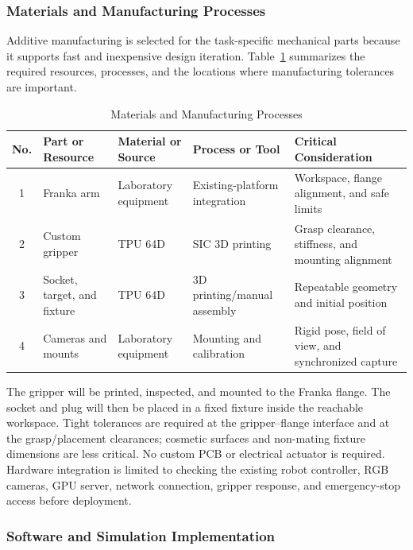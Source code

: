 \documentclass[12pt, letterpaper]{article}
\begin{document}
\subsubsection{Materials and Manufacturing Processes}

Additive manufacturing is selected for the task-specific mechanical parts
because it supports fast and inexpensive design iteration. Table~\ref{tab:manufacturing-processes}
summarizes the required resources, processes, and the locations where
manufacturing tolerances are important.

\begin{table}[H]
\centering
\caption{Materials and Manufacturing Processes}
\label{tab:manufacturing-processes}
\footnotesize
\setlength{\tabcolsep}{3pt}
\begin{tabularx}{\textwidth}{cXXXX}
\toprule
\textbf{No.} & \textbf{Part or Resource} & \textbf{Material or Source} &
\textbf{Process or Tool} & \textbf{Critical Consideration} \\
\midrule
1 & Franka arm & Laboratory equipment & Existing-platform integration &
Workspace, flange alignment, and safe limits \\
2 & Custom gripper & TPU 64D & SIC 3D printing &
Grasp clearance, stiffness, and mounting alignment \\
3 & Socket, target, and fixture & TPU 64D & 3D printing/manual assembly &
Repeatable geometry and initial position \\
4 & Cameras and mounts & Laboratory equipment & Mounting and calibration &
Rigid pose, field of view, and synchronized capture \\
\bottomrule
\end{tabularx}
\end{table}

The gripper will be printed, inspected, and mounted to the Franka flange. The
socket and plug will then be placed in a fixed fixture inside the
reachable workspace. Tight tolerances are required at the gripper--flange
interface and at the grasp/placement clearances; cosmetic surfaces and
non-mating fixture dimensions are less critical. No custom PCB or electrical
actuator is required. Hardware integration is limited to checking the existing
robot controller, RGB cameras, GPU server, network connection, gripper
response, and emergency-stop access before deployment.

\subsubsection{Software and Simulation Implementation}
\end{document}
